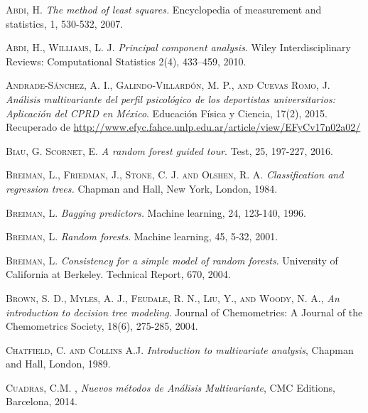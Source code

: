 
\begin{thebibliography}{99}
	

 \textsc{Abdi, H.} \emph{The method of least squares.} Encyclopedia of measurement and statistics, 1, 530-532, 2007.


 \textsc{Abdi, H., Williams, L. J.} \emph{Principal component analysis}. Wiley Interdisciplinary Reviews: Computational Statistics  2(4), 433–459, 2010.


\textsc{Andrade-Sánchez, A. I., Galindo-Villardón, M. P., and Cuevas Romo, J.} \emph{Análisis multivariante del perfil psicológico de los deportistas universitarios: Aplicación del CPRD en México}. Educación Física y Ciencia, 17(2), 2015.  Recuperado de \url{http://www.efyc.fahce.unlp.edu.ar/article/view/EFyCv17n02a02/}


\textsc{Biau, G. Scornet, E}. \textit{A random forest guided tour}. Test, 25, 197-227, 2016.

\textsc{Breiman, L., Friedman, J., Stone, C. J. and Olshen, R. A.} \emph{Classification and regression trees. }Chapman and Hall, New York, London, 1984.

\textsc{Breiman, L.} \emph{Bagging predictors.} Machine learning, 24, 123-140, 1996.

\textsc{Breiman, L.} \emph{Random forests}. Machine learning, 45, 5-32, 2001.

\textsc{Breiman, L.} \emph{Consistency for a simple model of random forests}. University of California at Berkeley. Technical Report, 670, 2004.

 \textsc{Brown, S. D.,  Myles, A. J., Feudale, R. N., Liu, Y., and Woody, N. A.,} \emph{An introduction to decision tree modeling}. Journal of Chemometrics: A Journal of the Chemometrics Society, 18(6), 275-285, 2004.

 \textsc{Chatfield, C. and Collins A.J}. {\em Introduction to multivariate analysis}, Chapman and Hall, London, 1989.

 \textsc{Cuadras, C.M. }, \textit{Nuevos métodos de Análisis Multivariante}, CMC Editions, Barcelona, 
2014.


\end{thebibliography}
